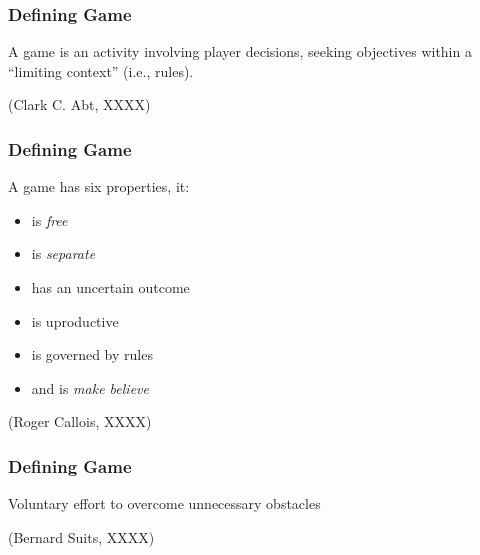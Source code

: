 \documentclass[handout, xcolor={dvipsnames}]{beamer}\usepackage{etoolbox}\newtoggle{printable}\toggletrue{printable}
\begin{document}
\begin{frame}
	\frametitle{Defining Game}
		
	\begin{center}
	\begin{huge}
	A game is an activity involving player decisions, seeking objectives within a ``limiting context'' (i.e., rules).
	\end{huge}
	
	\vspace{3em}
	
	(Clark C. Abt, XXXX)
	\end{center}

\end{frame}


\begin{frame}
	\frametitle{Defining Game}
		
	\begin{large}
	A game has six properties, it:
	
		\begin{itemize}
		\item is \textit{free}
		\item is \textit{separate}
		\item has an uncertain outcome
		\item is uproductive
		\item is governed by rules
		\item and is \textit{make believe}
	\end{itemize}
	\end{large}

	\vspace{1em}
	
  \begin{center}
	(Roger Callois, XXXX)
	\end{center}

\end{frame}

\begin{frame}
	\frametitle{Defining Game}
		
	\begin{center}
	\begin{huge}
	Voluntary effort to overcome unnecessary obstacles
	\end{huge}
	
	\vspace{3em}
	
	(Bernard Suits, XXXX)
	\end{center}

\end{frame}
\end{document}

